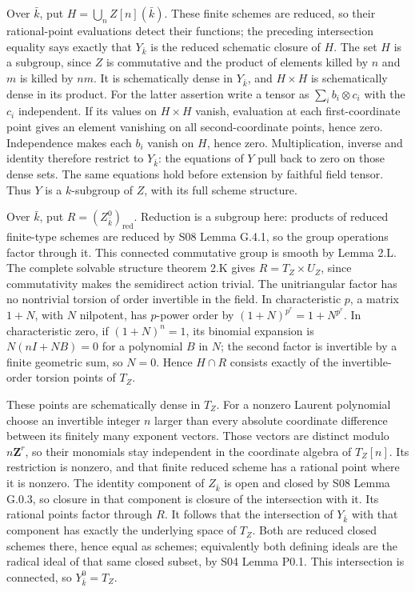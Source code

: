 \documentclass[11pt,a4paper,openany]{report}
\begin{document}
Over \(\bar k\), put \(H=\bigcup_n Z[n](\bar k)\). These finite schemes are reduced, so their rational-point evaluations detect their functions; the preceding intersection equality says exactly that \(Y_{\bar k}\) is the reduced schematic closure of \(H\). The set \(H\) is a subgroup, since \(Z\) is commutative and the product of elements killed by \(n\) and \(m\) is killed by \(nm\). It is schematically dense in \(Y_{\bar k}\), and \(H\times H\) is schematically dense in its product. For the latter assertion write a tensor as \(\sum_i b_i\otimes c_i\) with the \(c_i\) independent. If its values on \(H\times H\) vanish, evaluation at each first-coordinate point gives an element vanishing on all second-coordinate points, hence zero. Independence makes each \(b_i\) vanish on \(H\), hence zero. Multiplication, inverse and identity therefore restrict to \(Y_{\bar k}\): the equations of \(Y\) pull back to zero on those dense sets. The same equations hold before extension by faithful field tensor. Thus \(Y\) is a \(k\)-subgroup of \(Z\), with its full scheme structure.

Over \(\bar k\), put \(R=(Z_{\bar k}^0)_{\mathrm{red}}\). Reduction is a subgroup here: products of reduced finite-type schemes are reduced by S08 Lemma G.4.1, so the group operations factor through it. This connected commutative group is smooth by Lemma 2.L. The complete solvable structure theorem 2.K gives \(R=T_Z\times U_Z\), since commutativity makes the semidirect action trivial. The unitriangular factor has no nontrivial torsion of order invertible in the field. In characteristic \(p\), a matrix \(1+N\), with \(N\) nilpotent, has \(p\)-power order by \((1+N)^{p^r}=1+N^{p^r}\). In characteristic zero, if \((1+N)^n=1\), its binomial expansion is \(N(nI+N B)=0\) for a polynomial \(B\) in \(N\); the second factor is invertible by a finite geometric sum, so \(N=0\). Hence \(H\cap R\) consists exactly of the invertible-order torsion points of \(T_Z\).

These points are schematically dense in \(T_Z\). For a nonzero Laurent polynomial choose an invertible integer \(n\) larger than every absolute coordinate difference between its finitely many exponent vectors. Those vectors are distinct modulo \(n\mathbf Z^r\), so their monomials stay independent in the coordinate algebra of \(T_Z[n]\). Its restriction is nonzero, and that finite reduced scheme has a rational point where it is nonzero. The identity component of \(Z_{\bar k}\) is open and closed by S08 Lemma G.0.3, so closure in that component is closure of the intersection with it. Its rational points factor through \(R\). It follows that the intersection of \(Y_{\bar k}\) with that component has exactly the underlying space of \(T_Z\). Both are reduced closed schemes there, hence equal as schemes; equivalently both defining ideals are the radical ideal of that same closed subset, by S04 Lemma P0.1. This intersection is connected, so \(Y_{\bar k}^0=T_Z\).
\end{document}
